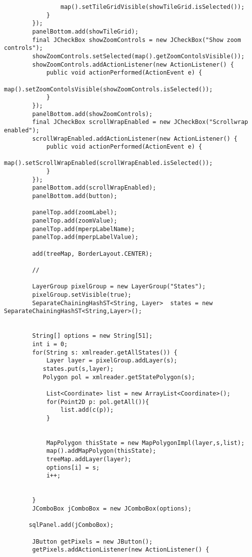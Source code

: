 \begin{verbatim}
                map().setTileGridVisible(showTileGrid.isSelected());
            }
        });
        panelBottom.add(showTileGrid);
        final JCheckBox showZoomControls = new JCheckBox("Show zoom controls");
        showZoomControls.setSelected(map().getZoomContolsVisible());
        showZoomControls.addActionListener(new ActionListener() {
            public void actionPerformed(ActionEvent e) {
                map().setZoomContolsVisible(showZoomControls.isSelected());
            }
        });
        panelBottom.add(showZoomControls);
        final JCheckBox scrollWrapEnabled = new JCheckBox("Scrollwrap enabled");
        scrollWrapEnabled.addActionListener(new ActionListener() {
            public void actionPerformed(ActionEvent e) {
                map().setScrollWrapEnabled(scrollWrapEnabled.isSelected());
            }
        });
        panelBottom.add(scrollWrapEnabled);
        panelBottom.add(button);

        panelTop.add(zoomLabel);
        panelTop.add(zoomValue);
        panelTop.add(mperpLabelName);
        panelTop.add(mperpLabelValue);

        add(treeMap, BorderLayout.CENTER);

        //

        LayerGroup pixelGroup = new LayerGroup("States");
        pixelGroup.setVisible(true);
        SeparateChainingHashST<String, Layer>  states = new SeparateChainingHashST<String,Layer>();


        String[] options = new String[51];
        int i = 0;
        for(String s: xmlreader.getAllStates()) {
            Layer layer = pixelGroup.addLayer(s);
           states.put(s,layer);
           Polygon pol = xmlreader.getStatePolygon(s);

            List<Coordinate> list = new ArrayList<Coordinate>();
            for(Point2D p: pol.getAll()){
                list.add(c(p));
            }


            MapPolygon thisState = new MapPolygonImpl(layer,s,list);
            map().addMapPolygon(thisState);
            treeMap.addLayer(layer);
            options[i] = s;
            i++;


        }
        JComboBox jComboBox = new JComboBox(options);

       sqlPanel.add(jComboBox);

        JButton getPixels = new JButton();
        getPixels.addActionListener(new ActionListener() {


\end{verbatim}
